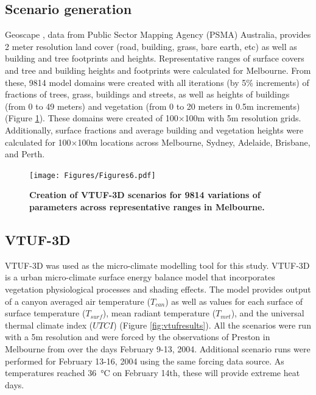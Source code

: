\documentclass[final,3p,times,authoryear]{elsarticle}
\begin{document}
\subsection{Scenario generation}\label{sec:methodsgen}
Geoscape \citep{Geoscape2020}, data from Public Sector Mapping Agency (PSMA) Australia, provides 2 meter resolution land cover (road, building, grass, bare earth, etc) as well as building and tree footprints and heights. Representative ranges of surface covers and tree and building heights and footprints were calculated for Melbourne.  From these, 9814 model domains were created with all iterations (by 5\% increments) of fractions of trees, grass, buildings and streets, as well as heights of buildings (from 0 to 49 meters) and vegetation (from 0 to 20 meters in 0.5m increments) (Figure \ref{fig:scenarios}). These domains were created of 100$\times$100m with 5m resolution grids. Additionally, surface fractions and average building and vegetation heights were calculated for 100$\times$100m locations across Melbourne, Sydney, Adelaide, Brisbane, and Perth. 


\begin{figure}
\centering
\texttt{[image: Figures/Figures6.pdf]}
\caption{\bf Creation of VTUF-3D scenarios for 9814 variations of parameters across representative ranges in Melbourne.}
 \label{fig:scenarios}
\end{figure} 




\subsection{VTUF-3D}\label{sec:methodsvtuf}
VTUF-3D \citep{Nice2018a} was used as the micro-climate modelling tool for this study. VTUF-3D is a urban micro-climate surface energy balance model that incorporates vegetation physiological processes and shading effects. The model provides output of a canyon averaged air temperature ($T_{can}$) as well as values for each surface of surface temperature ($T_{surf}$), mean radiant temperature ($T_{mrt}$), and the universal thermal climate index ($UTCI$) (Figure \ref{fig:vtufresults}). All the scenarios were run with a 5m resolution and were forced by the observations of Preston in Melbourne from \cite{Coutts2007} over the days February 9-13, 2004. Additional scenario runs were performed for February 13-16, 2004 using the same forcing data source. As temperatures reached 36\SI{}{\degreeCelsius} on February 14th, these will provide extreme heat days.
\end{document}
